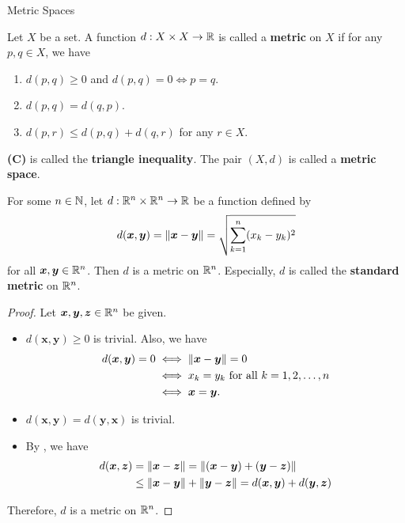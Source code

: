 \begin{section}{Metric Spaces}

Let $X$ be a set. A function $d: X \times X \to \R$ is called a \textbf{metric} on $X$ if for any $p, q \in X$, we have
\begin{enumerate}[label=\textbf{(\Alph*)}]
    \item $d(p, q) \geq 0$ and $d(p, q) = 0 \iff p = q$.
    \item $d(p, q) = d(q, p)$.
    \item $d(p, r) \leq d(p, q) + d(q, r)$ for any $r \in X$.
\end{enumerate}
\textbf{(C)} is called the \textbf{triangle inequality}. The pair $(X, d)$ is called a \textbf{metric space}.

\bigskip

\begin{theorem} \label{thm:StandardMetricOnRn}
    For some $n \in \N$, let $d: \R^{n} \times \R^{n} \to \R$ be a function defined by
    \[
    d(\bm{x}, \bm{y}) = \norm*{\bm{x} - \bm{y}} = \sqrt{\sum_{k = 1}^{n} (x_{k} - y_{k})^{2}}
    \]
    for all $\bm{x}, \bm{y} \in \R^{n}$. Then $d$ is a metric on $\R^{n}$.
    Especially, $d$ is called the \textbf{standard metric} on $\R^{n}$.
\end{theorem}

\begin{proof}
    Let $\bm{x}, \bm{y}, \bm{z} \in \R^{n}$ be given.
    \begin{itemize}
        \item $d(\bm{x}, \bm{y}) \geq 0$ is trivial. Also, we have
        \begin{align*}
            d(\bm{x}, \bm{y}) = 0 &\iff \norm*{\bm{x} - \bm{y}} = 0 \\
            &\iff x_{k} = y_{k} \text{ for all } k = 1, 2, \dots, n \\
            &\iff \bm{x} = \bm{y}.
        \end{align*}
        \item $d(\bm{x}, \bm{y}) = d(\bm{y}, \bm{x})$ is trivial.
        \item By , we have
        \begin{align*}
            d(\bm{x}, \bm{z}) &= \norm*{\bm{x} - \bm{z}} =
            \norm*{(\bm{x} - \bm{y}) + (\bm{y} - \bm{z})} \\
            &\leq \norm*{\bm{x} - \bm{y}} + \norm*{\bm{y} - \bm{z}}
            = d(\bm{x},\bm{y}) + d(\bm{y},\bm{z})
        \end{align*}
    \end{itemize}
    Therefore, $d$ is a metric on $\R^{n}$.
\end{proof}


\end{section}
